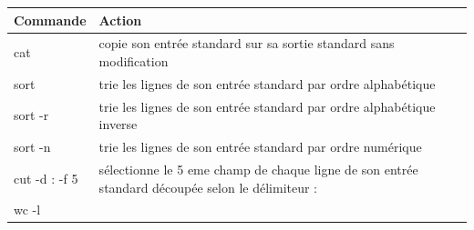 \documentclass[
  11pt,
]{article}
\begin{document}
\begin{longtable}[]{@{}ll@{}}
\toprule
\begin{minipage}[b]{0.13\columnwidth}\raggedright
Commande\strut
\end{minipage} & \begin{minipage}[b]{0.81\columnwidth}\raggedright
Action\strut
\end{minipage}\tabularnewline
\midrule
\endhead
\begin{minipage}[t]{0.13\columnwidth}\raggedright
cat\strut
\end{minipage} & \begin{minipage}[t]{0.81\columnwidth}\raggedright
copie son entrée standard sur sa sortie standard sans modification\strut
\end{minipage}\tabularnewline
\begin{minipage}[t]{0.13\columnwidth}\raggedright
sort\strut
\end{minipage} & \begin{minipage}[t]{0.81\columnwidth}\raggedright
trie les lignes de son entrée standard par ordre alphabétique\strut
\end{minipage}\tabularnewline
\begin{minipage}[t]{0.13\columnwidth}\raggedright
sort -r\strut
\end{minipage} & \begin{minipage}[t]{0.81\columnwidth}\raggedright
trie les lignes de son entrée standard par ordre alphabétique
inverse\strut
\end{minipage}\tabularnewline
\begin{minipage}[t]{0.13\columnwidth}\raggedright
sort -n\strut
\end{minipage} & \begin{minipage}[t]{0.81\columnwidth}\raggedright
trie les lignes de son entrée standard par ordre numérique\strut
\end{minipage}\tabularnewline
\begin{minipage}[t]{0.13\columnwidth}\raggedright
cut -d : -f 5\strut
\end{minipage} & \begin{minipage}[t]{0.81\columnwidth}\raggedright
sélectionne le 5 eme champ de chaque ligne de son entrée standard
découpée selon le délimiteur :\strut
\end{minipage}\tabularnewline
\begin{minipage}[t]{0.13\columnwidth}\raggedright
wc -l\strut
\end{minipage} & \begin{minipage}[t]{0.81\columnwidth}\raggedright

\end{minipage}
\end{longtable}
\end{document}

